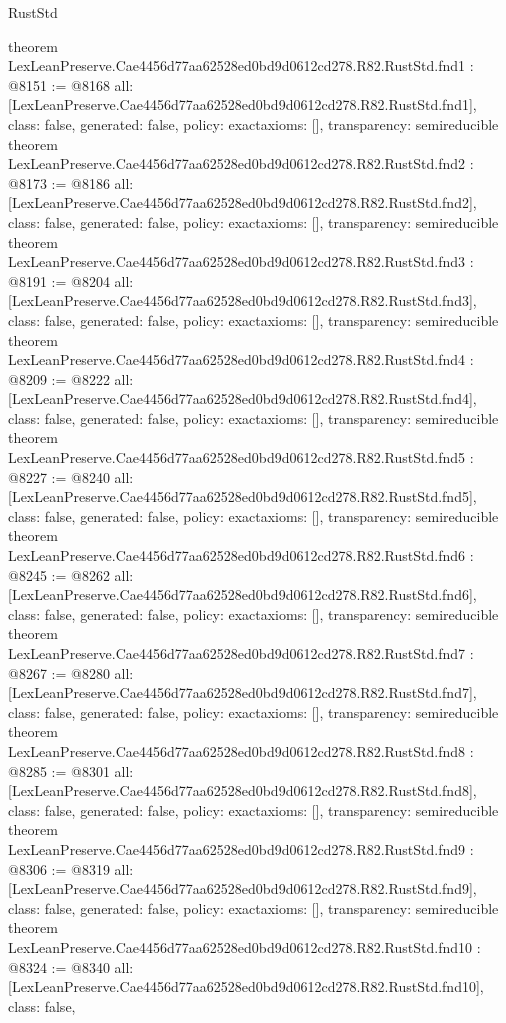 \begin{lexlean}{RustStd}
\begin{coremodule}
{}
theorem LexLeanPreserve.Cae4456d77aa62528ed0bd9d0612cd278.R82.RustStd.fnd1 : @8151 := @8168 {
  all: [LexLeanPreserve.Cae4456d77aa62528ed0bd9d0612cd278.R82.RustStd.fnd1],
  class: false,
  generated: false,
  policy: exact{axioms: []},
  transparency: semireducible
}
theorem LexLeanPreserve.Cae4456d77aa62528ed0bd9d0612cd278.R82.RustStd.fnd2 : @8173 := @8186 {
  all: [LexLeanPreserve.Cae4456d77aa62528ed0bd9d0612cd278.R82.RustStd.fnd2],
  class: false,
  generated: false,
  policy: exact{axioms: []},
  transparency: semireducible
}
theorem LexLeanPreserve.Cae4456d77aa62528ed0bd9d0612cd278.R82.RustStd.fnd3 : @8191 := @8204 {
  all: [LexLeanPreserve.Cae4456d77aa62528ed0bd9d0612cd278.R82.RustStd.fnd3],
  class: false,
  generated: false,
  policy: exact{axioms: []},
  transparency: semireducible
}
theorem LexLeanPreserve.Cae4456d77aa62528ed0bd9d0612cd278.R82.RustStd.fnd4 : @8209 := @8222 {
  all: [LexLeanPreserve.Cae4456d77aa62528ed0bd9d0612cd278.R82.RustStd.fnd4],
  class: false,
  generated: false,
  policy: exact{axioms: []},
  transparency: semireducible
}
theorem LexLeanPreserve.Cae4456d77aa62528ed0bd9d0612cd278.R82.RustStd.fnd5 : @8227 := @8240 {
  all: [LexLeanPreserve.Cae4456d77aa62528ed0bd9d0612cd278.R82.RustStd.fnd5],
  class: false,
  generated: false,
  policy: exact{axioms: []},
  transparency: semireducible
}
theorem LexLeanPreserve.Cae4456d77aa62528ed0bd9d0612cd278.R82.RustStd.fnd6 : @8245 := @8262 {
  all: [LexLeanPreserve.Cae4456d77aa62528ed0bd9d0612cd278.R82.RustStd.fnd6],
  class: false,
  generated: false,
  policy: exact{axioms: []},
  transparency: semireducible
}
theorem LexLeanPreserve.Cae4456d77aa62528ed0bd9d0612cd278.R82.RustStd.fnd7 : @8267 := @8280 {
  all: [LexLeanPreserve.Cae4456d77aa62528ed0bd9d0612cd278.R82.RustStd.fnd7],
  class: false,
  generated: false,
  policy: exact{axioms: []},
  transparency: semireducible
}
theorem LexLeanPreserve.Cae4456d77aa62528ed0bd9d0612cd278.R82.RustStd.fnd8 : @8285 := @8301 {
  all: [LexLeanPreserve.Cae4456d77aa62528ed0bd9d0612cd278.R82.RustStd.fnd8],
  class: false,
  generated: false,
  policy: exact{axioms: []},
  transparency: semireducible
}
theorem LexLeanPreserve.Cae4456d77aa62528ed0bd9d0612cd278.R82.RustStd.fnd9 : @8306 := @8319 {
  all: [LexLeanPreserve.Cae4456d77aa62528ed0bd9d0612cd278.R82.RustStd.fnd9],
  class: false,
  generated: false,
  policy: exact{axioms: []},
  transparency: semireducible
}
theorem LexLeanPreserve.Cae4456d77aa62528ed0bd9d0612cd278.R82.RustStd.fnd10 : @8324 := @8340 {
  all: [LexLeanPreserve.Cae4456d77aa62528ed0bd9d0612cd278.R82.RustStd.fnd10],
  class: false,
}
\end{coremodule}
\end{lexlean}
